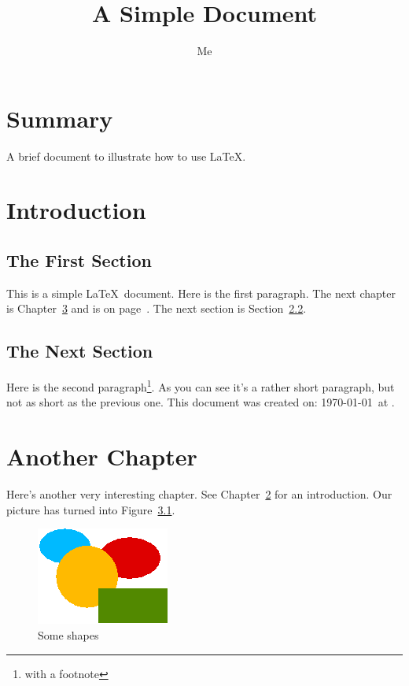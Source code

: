\documentclass[12pt]{scrbook}
\title{A Simple Document}
\author{Me}
\begin{document}
\maketitle

\frontmatter
\tableofcontents
\listoffigures

\chapter{Summary}
A brief document to
illustrate how to use \LaTeX.

\mainmatter
\chapter{Introduction}
\label{ch:intro}

\section{The First Section}

This is a simple \LaTeX\ document.
Here is the first paragraph.
The next chapter is Chapter~\ref{ch:another}
and is on page~\pageref{ch:another}.
The next section is Section~\ref{sec:next}.

\section{The Next Section}
\label{sec:next}

Here is the second paragraph\footnote{with a footnote}. 
As you can see it's a rather short paragraph, but not 
as short as the previous one. This document was 
created on: \today\ at \currenttime.

\chapter{Another Chapter}
\label{ch:another}

Here's another very interesting chapter.
See Chapter~\ref{ch:intro} for an 
introduction. Our picture has turned
into Figure~\ref{fig:shapes}.

\begin{figure}[hbtp]
\centering
\includegraphics{shapes}
\caption{Some shapes}
\label{fig:shapes}
\end{figure}
\end{document}
